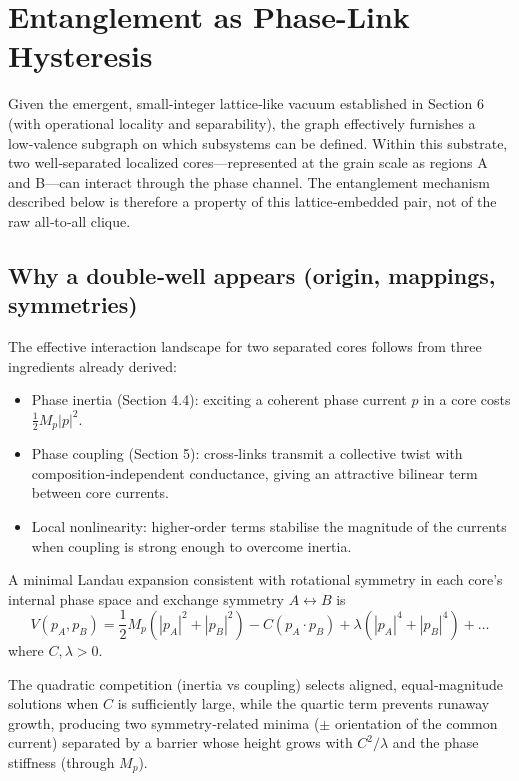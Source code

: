 \documentclass[11pt]{article}
\begin{document}
\section{Entanglement as Phase-Link Hysteresis}

Given the emergent, small‑integer lattice‑like vacuum established in Section 6 (with operational locality and separability), the graph effectively furnishes a low‑valence subgraph on which subsystems can be defined. Within this substrate, two well‑separated localized cores—represented at the grain scale as regions A and B—can interact through the phase channel. The entanglement mechanism described below is therefore a property of this lattice‑embedded pair, not of the raw all‑to‑all clique.

\subsection{Why a double‑well appears (origin, mappings, symmetries)}

The effective interaction landscape for two separated cores follows from three ingredients already derived:
\begin{itemize}
\item Phase inertia (Section 4.4): exciting a coherent phase current $p$ in a core costs $\frac{1}{2} M_p |p|^2$.
\item Phase coupling (Section 5): cross‑links transmit a collective twist with composition‑independent conductance, giving an attractive bilinear term between core currents.
\item Local nonlinearity: higher‑order terms stabilise the magnitude of the currents when coupling is strong enough to overcome inertia.
\end{itemize}

A minimal Landau expansion consistent with rotational symmetry in each core's internal phase space and exchange symmetry $A \leftrightarrow B$ is
\begin{equation}
V(p_A, p_B) = \frac{1}{2} M_p (|p_A|^2 + |p_B|^2) - C (p_A \cdot p_B) + \lambda (|p_A|^4 + |p_B|^4) + \ldots
\end{equation}
where $C, \lambda > 0$.

The quadratic competition (inertia vs coupling) selects aligned, equal‑magnitude solutions when $C$ is sufficiently large, while the quartic term prevents runaway growth, producing two symmetry‑related minima ($\pm$ orientation of the common current) separated by a barrier whose height grows with $C^2/\lambda$ and the phase stiffness (through $M_p$).
\end{document}
